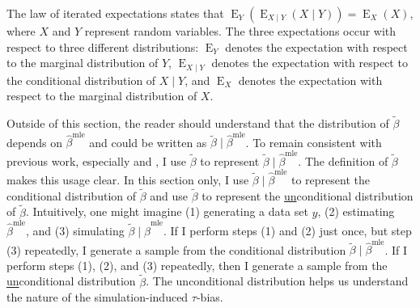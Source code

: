 \documentclass[12pt]{article}
\DeclareMathOperator*{\E}{\text{E}}
\begin{document}
The law of iterated expectations states that $\E_Y \left( \E_{X \mid Y}(X \mid Y) \right) = \E_X(X)$, where $X$ and $Y$ represent random variables.
The three expectations occur with respect to three different distributions: $\E_Y$ denotes the expectation with respect to the marginal distribution of $Y$, $\E_{X \mid Y}$ denotes the expectation with respect to the conditional distribution of $X \mid Y$, and $\E_X$ denotes the expectation with respect to the marginal distribution of $X$.

Outside of this section, the reader should understand that the distribution of $\tilde{\beta}$ depends on $\hat{\beta}^\text{mle}$ and could be written as $\tilde{\beta} \mid \hat{\beta}^\text{mle}$.
To remain consistent with previous work, especially \cite{KingTomzWittenberg2000} and \cite{Herron1999}, I use $\tilde{\beta}$ to represent $\tilde{\beta} \mid \hat{\beta}^\text{mle}$.
The definition of $\tilde{\beta}$ makes this usage clear.
In this section only, I use $\tilde{\beta} \mid \hat{\beta}^\text{mle}$ to represent the conditional distribution of $\tilde{\beta}$ and use $\tilde{\beta}$ to represent the \underline{un}conditional distribution of $\tilde{\beta}$.
Intuitively, one might imagine (1) generating a data set $y$, (2) estimating $\hat{\beta}^\text{mle}$, and (3) simulating $\tilde{\beta} \mid \hat{\beta}^\text{mle}$.
If I perform steps (1) and (2) just once, but step (3) repeatedly, I generate a sample from the conditional distribution $\tilde{\beta} \mid \hat{\beta}^\text{mle}$.
If I perform steps (1), (2), and (3) repeatedly, then I generate a sample from the \underline{un}conditional distribution $\tilde{\beta}$.
The unconditional distribution helps us understand the nature of the simulation-induced $\tau$-bias.
\end{document}
